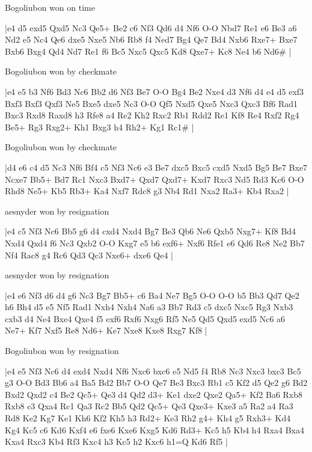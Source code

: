 \showboard

Bogoliubon won on time

\makegametitle
|e4 d5 exd5 Qxd5 Nc3 Qe5+ Be2 c6 Nf3 Qd6 d4 Nf6 O-O Nbd7 Re1 e6 Be3 a6 Nd2 e5 Nc4 Qe6 dxe5 Nxe5 Nb6 Rb8 f4 Ned7 Bg4 Qe7 Bd4 Nxb6 Rxe7+ Bxe7 Bxb6 Bxg4 Qd4 Nd7 Re1 f6 Bc5 Nxc5 Qxc5 Kd8 Qxe7+ Kc8 Ne4 b6 Nd6\#  |

\showboard

Bogoliubon won by checkmate

\makegametitle
|e4 e5 b3 Nf6 Bd3 Nc6 Bb2 d6 Nf3 Be7 O-O Bg4 Be2 Nxe4 d3 Nf6 d4 e4 d5 exf3 Bxf3 Bxf3 Qxf3 Ne5 Bxe5 dxe5 Nc3 O-O Qf5 Nxd5 Qxe5 Nxc3 Qxc3 Bf6 Rad1 Bxc3 Rxd8 Raxd8 h3 Rfe8 a4 Re2 Kh2 Rxc2 Rb1 Rdd2 Re1 Kf8 Re4 Rxf2 Rg4 Be5+ Rg3 Rxg2+ Kh1 Bxg3 h4 Rh2+ Kg1 Rc1\#  |

\showboard

Bogoliubon won by checkmate

\makegametitle
|d4 e6 c4 d5 Nc3 Nf6 Bf4 c5 Nf3 Nc6 e3 Be7 dxc5 Bxc5 cxd5 Nxd5 Bg5 Be7 Bxe7 Ncxe7 Bb5+ Bd7 Rc1 Nxc3 Bxd7+ Qxd7 Qxd7+ Kxd7 Rxc3 Nd5 Rd3 Kc6 O-O Rhd8 Ne5+ Kb5 Rb3+ Ka4 Nxf7 Rdc8 g3 Nb4 Rd1 Nxa2 Ra3+ Kb4 Rxa2  |

\showboard

aesnyder won by resignation

\makegametitle
|e4 c5 Nf3 Nc6 Bb5 g6 d4 cxd4 Nxd4 Bg7 Be3 Qb6 Ne6 Qxb5 Nxg7+ Kf8 Bd4 Nxd4 Qxd4 f6 Nc3 Qxb2 O-O Kxg7 e5 b6 exf6+ Nxf6 Rfe1 e6 Qd6 Re8 Ne2 Bb7 Nf4 Rac8 g4 Rc6 Qd3 Qc3 Nxe6+ dxe6 Qe4  |

\showboard

aesnyder won by resignation

\makegametitle
|e4 e6 Nf3 d6 d4 g6 Nc3 Bg7 Bb5+ c6 Ba4 Ne7 Bg5 O-O O-O b5 Bb3 Qd7 Qe2 h6 Bh4 d5 e5 Nf5 Rad1 Nxh4 Nxh4 Na6 a3 Bb7 Rd3 c5 dxc5 Nxc5 Rg3 Nxb3 cxb3 d4 Ne4 Bxe4 Qxe4 f5 exf6 Rxf6 Nxg6 Rf5 Ne5 Qd5 Qxd5 exd5 Nc6 a6 Ne7+ Kf7 Nxf5 Re8 Nd6+ Ke7 Nxe8 Kxe8 Rxg7 Kf8  |

\showboard

Bogoliubon won by resignation

\makegametitle
|e4 e5 Nf3 Nc6 d4 exd4 Nxd4 Nf6 Nxc6 bxc6 e5 Nd5 f4 Rb8 Nc3 Nxc3 bxc3 Bc5 g3 O-O Bd3 Bb6 a4 Ba5 Bd2 Bb7 O-O Qe7 Be3 Bxc3 Rb1 c5 Kf2 d5 Qe2 g6 Bd2 Bxd2 Qxd2 c4 Be2 Qc5+ Qe3 d4 Qd2 d3+ Ke1 dxe2 Qxe2 Qa5+ Kf2 Ba6 Rxb8 Rxb8 c3 Qxa4 Rc1 Qa3 Rc2 Bb5 Qd2 Qc5+ Qe3 Qxe3+ Kxe3 a5 Ra2 a4 Ra3 Rd8 Ke2 Kg7 Ke1 Kh6 Kf2 Kh5 h3 Rd2+ Ke3 Rh2 g4+ Kh4 g5 Rxh3+ Kd4 Kg4 Kc5 c6 Kd6 Kxf4 e6 fxe6 Kxe6 Kxg5 Kd6 Rd3+ Kc5 h5 Kb4 h4 Rxa4 Bxa4 Kxa4 Rxc3 Kb4 Rf3 Kxc4 h3 Kc5 h2 Kxc6 h1=Q Kd6 Rf5  |

